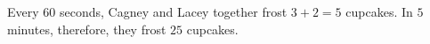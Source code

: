 Every $60$ seconds, Cagney and Lacey together frost $3+2=5$ cupcakes. In $5$ minutes, therefore, they frost $25$ cupcakes. 